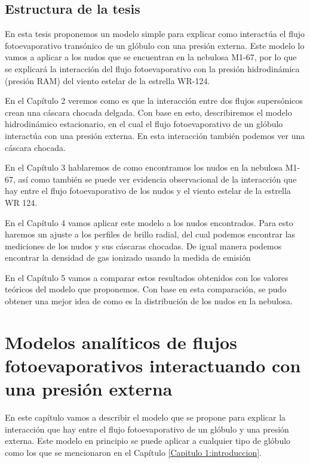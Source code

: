 \documentclass{book}
\begin{document}
\section{Estructura de la tesis}

En esta tesis proponemos un modelo simple para explicar como interactúa el flujo fotoevaporativo transónico de un glóbulo con una presión externa. Este modelo lo vamos a aplicar  a los nudos que se encuentran en la nebulosa M1-67, por lo que se explicará la interacción del flujo fotoevaporativo con la presión hidrodinámica (presión RAM) del viento estelar de la estrella WR-124.

En el Capítulo 2 veremos como es que la interacción entre dos flujos supersónicos crean una cáscara chocada delgada. Con base en esto, describiremos el modelo hidrodinámico estacionario, en el cual el flujo fotoevaporativo de un glóbulo interactúa con una presión externa. En esta interacción también podemos ver una cáscara chocada.

En el Capítulo 3 hablaremos de como encontramos los nudos en la nebulosa M1-67, así como también se puede ver evidencia observacional de la interacción que hay entre el flujo fotoevaporativo de los nudos y el viento estelar de la estrella WR 124.

En el Capítulo 4 vamos aplicar este modelo a los nudos encontrados. Para esto haremos un ajuste a los perfiles de brillo radial, del cual podemos encontrar las mediciones de los nudos y sus cáscaras chocadas. De igual manera podemos encontrar la densidad de gas ionizado usando la medida de emisión

En el Capítulo 5 vamos a comparar estos resultados obtenidos con los valores teóricos del modelo que proponemos. Con base en esta comparación, se pudo obtener una mejor idea de como es la distribución de los nudos en la nebulosa.  

\chapter{Modelos analíticos de flujos fotoevaporativos interactuando con una presión externa}
\label{Chapter : Modelo}

En este capítulo vamos a describir el modelo que se propone para explicar la interacción que hay entre el flujo fotoevaporativo de un glóbulo y una presión externa. Este modelo en principio se puede aplicar a cualquier tipo de glóbulo como los que se mencionaron en el Capítulo \ref{Capitulo 1:introduccion}. 
\end{document}
